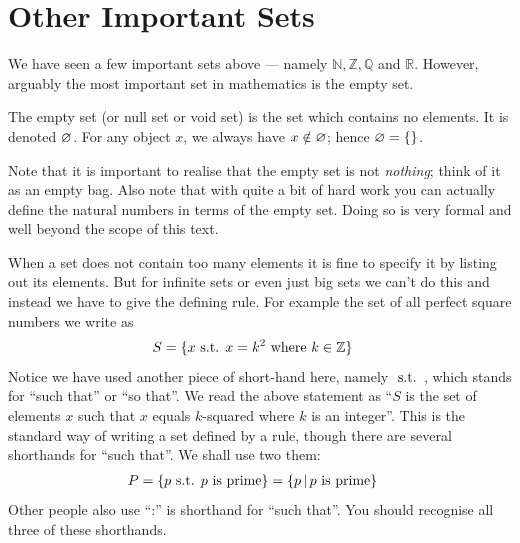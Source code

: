 \section{Other Important Sets}
We have seen a few important sets above --- namely $\mathbb{N}, \mathbb{Z},
\mathbb{Q}$ and $\mathbb{R}$. However, arguably the most important set in
mathematics is the empty set.
\begin{defn}
  The empty set (or null set or void set) is the set which contains no
elements. It is denoted ${\varnothing}$. For any object $x$, we always
have $x \notin {\varnothing}$; hence ${\varnothing} = \{ \}$.
\end{defn}
Note that it is important to realise that the empty set is not \emph{nothing}; think of it
as an empty bag. Also note that with quite a bit of hard work you can actually define the
natural numbers in terms of the empty set. Doing so is very formal and well beyond the
scope of this text.


When a set does not contain too many elements it is fine to specify it by listing out its
elements.  But for infinite sets or even just big sets we can't do this and instead we
have to give the defining rule. For example the set of all perfect square numbers we
write as
\begin{align*}
  S &= \{x {\mbox{ s.t. }} x = k^2 \mbox{ where } k \in \mathbb{Z} \}
\end{align*}
Notice we have used another piece of short-hand here, namely ${\mbox{ s.t. }}$, which
stands for ``such that'' or ``so that''. We read the above statement as ``$S$ is
the set of elements $x$ such that $x$ equals $k$-squared where $k$ is an
integer''. This is the standard way of writing a set defined by a rule, though there are
several shorthands for ``such that''. We shall use two them:
\begin{align*}
  P &= \{ p {\mbox{ s.t. }} p \mbox{ is prime} \} = \{ p \,|\, p \mbox{ is prime} \}
\end{align*}
Other people also use ``:'' is shorthand for ``such that''. You should recognise all
three of these shorthands.

